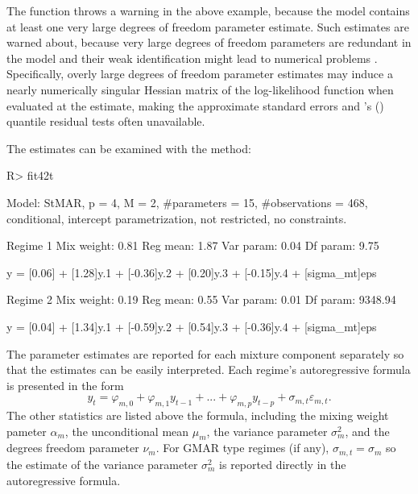 \documentclass[nojss]{jss} %
\begin{document}
The function throws a warning in the above example, because the model contains at least one very large degrees of freedom parameter estimate. Such estimates are warned about, because very large degrees of freedom parameters are redundant in the model and their weak identification might lead to numerical problems \citep[Section 4]{Virolainen:2020}. Specifically, overly large degrees of freedom parameter estimates may induce a nearly numerically singular Hessian matrix of the log-likelihood function when evaluated at the estimate, making the approximate standard errors and  \citeauthor{Kalliovirta:2012}'s (\citeyear{Kalliovirta:2012}) quantile residual tests often unavailable.

The estimates can be examined with the  method:
%
\begin{CodeChunk}
\begin{CodeInput}
R> fit42t
\end{CodeInput}
\begin{CodeOutput}
Model:
 StMAR, p = 4, M = 2, #parameters = 15, #observations = 468,
 conditional, intercept parametrization, not restricted, no constraints.

Regime 1
Mix weight: 0.81
Reg mean: 1.87
Var param: 0.04
Df param: 9.75

y = [0.06] + [1.28]y.1 + [-0.36]y.2 + [0.20]y.3 + [-0.15]y.4 + [sigma_mt]eps

Regime 2
Mix weight: 0.19
Reg mean: 0.55
Var param: 0.01
Df param: 9348.94

y = [0.04] + [1.34]y.1 + [-0.59]y.2 + [0.54]y.3 + [-0.36]y.4 + [sigma_mt]eps
\end{CodeOutput}
\end{CodeChunk}
%
The parameter estimates are reported for each mixture component separately so that the estimates can be easily interpreted. Each regime's autoregressive formula is presented in the form
\begin{equation}
y_t = \varphi_{m,0} + \varphi_{m,1}y_{t - 1} + ... + \varphi_{m,p}y_{t - p} + \sigma_{m,t}\varepsilon_{m,t}.
\end{equation}
The other statistics are listed above the formula, including the mixing weight pameter $\alpha_m$, the unconditional mean $\mu_m$, the variance parameter $\sigma_m^2$, and the degrees freedom parameter $\nu_m$. For GMAR type regimes (if any), $\sigma_{m,t}=\sigma_m$ so the estimate of the variance parameter $\sigma_m^2$ is reported directly in the autoregressive formula.
\end{document}
